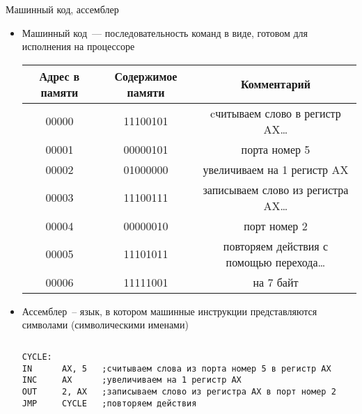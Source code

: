 \documentclass[aspectratio=169,14pt]{beamer}
\begin{document}
\begin{frame}[containsverbatim]{Машинный код, ассемблер}
    \begin{itemize}
        \item \footnotesize{Машинный код~--- последовательность команд в виде, готовом для исполнения на процессоре}
        \begin{table}
            \centering
            \begin{tiny}
            \begin{tabular}{ccc}
                \textbf{Адрес в памяти} & \textbf{Содержимое памяти} & \textbf{Комментарий} \\ \hline
                00000 & 11100101 & cчитываем слово в регистр AX\ldots \\
                00001 & 00000101 &  порта номер 5 \\
                00002 & 01000000 & увеличиваем на 1 регистр AX \\
                00003 & 11100111 & записываем слово из регистра AX\ldots \\
                00004 & 00000010 &  порт номер 2 \\
                00005 & 11101011 & повторяем действия с помощью перехода\ldots \\
                00006 & 11111001 &  на 7 байт \\
            \end{tabular}
            \end{tiny}
        \end{table}
        \item \footnotesize{Ассемблер~-- язык, в котором машинные инструкции представляются символами (символическими именами)}
        \begin{columns}[T,onlytextwidth]
            \begin{column}{0.7\textwidth}
                \begin{tiny}
                \begin{verbatim}
CYCLE:
IN      AX, 5   ;считываем слова из порта номер 5 в регистр AX
INC     AX      ;увеличиваем на 1 регистр AX
OUT     2, AX   ;записываем слово из регистра AX в порт номер 2
JMP     CYCLE   ;повторяем действия
                \end{verbatim}
                \end{tiny}
            \end{column}
            \begin{column}{0.3\textwidth}

\end{column}
\end{columns}
\end{itemize}
\end{frame}
\end{document}
